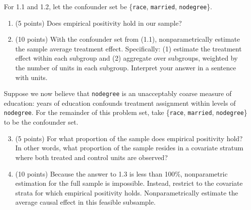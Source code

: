 \documentclass[10pt]{article}
\begin{document}
For 1.1 and 1.2, let the confounder set be \{\texttt{race}, \texttt{married}, \texttt{nodegree}\}.
\begin{enumerate}
    \item (5 points) Does empirical positivity hold in our sample?
    \item (10 points) With the confounder set from (1.1), nonparametrically estimate the sample average treatment effect. Specifically: (1) estimate the treatment effect within each subgroup and (2) aggregate over subgroups, weighted by the number of units in each subgroup. Interpret your answer in a sentence with units.
\end{enumerate}
Suppose we now believe that \texttt{nodegree} is an unacceptably coarse measure of education: years of education confounds treatment assignment within levels of \texttt{nodegree}. For the remainder of this problem set, take \{\texttt{race}, \texttt{married}, \texttt{nodegree}\} to be the confounder set.
\begin{enumerate}\setcounter{enumi}{2}
    \item (5 points) For what proportion of the sample does empirical positivity hold? In other words, what proportion of the sample resides in a covariate stratum where both treated and control units are observed?
    \item (10 points) Because the answer to 1.3 is less than 100\%, nonparametric estimation for the full sample is impossible. Instead, restrict to the covariate strata for which empirical positivity holds. Nonparametrically estimate the average causal effect in this feasible subsample.
\end{enumerate}
\end{document}
